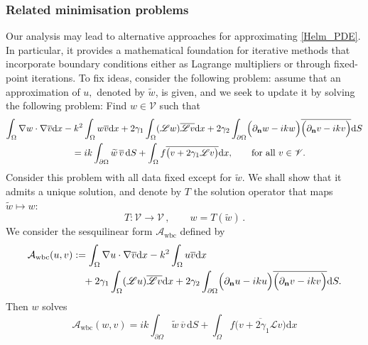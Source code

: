 \documentclass[twoside,11pt]{article}
\def\d{{\mathrm d}}
\def\L{{\mathscr{L}}}
\def\vbar{\overline{v}}
\def\Vc{{\mathscr V}}
\def\L{{\mathscr{L}}}
\begin{document}
{\subsubsection*{Related minimisation problems}
Our analysis may lead to alternative approaches for approximating \eqref{Helm_PDE}. In particular, it provides a mathematical foundation for iterative methods that incorporate boundary conditions either as Lagrange multipliers or through fixed-point iterations. To fix ideas, consider the following problem: assume that an approximation of $u, $ denoted by $\tilde w$, is given, and we seek to update it by solving the following problem:
  Find $w \in \Vc$ such that 
\begin{equation}\label{fixed_p_1}
\begin{split}
  \int_\Omega \nabla w\cdot \nabla \overline{v}  \d x  &-  k^2 \int_\Omega w \overline{v}  \d x
  +
  2\gamma_1 \int_{\Omega} (\L w)  \overline{\L v}  \d x
 +  2\gamma_2 \int_{\partial\Omega} 
\Bigl(\partial_{\mathbf n}w - i k w \Bigr) 
\overline{\Bigl(\partial_{\mathbf n}v - i k v \Bigr)}  \d S \\
&\quad  =   {ik} \int_{\partial \Omega}\widetilde w \, \vbar \,   \d S  +  \int_{\Omega} f  \overline{\bigl(v + 2\gamma_1 \L v\bigr)}  \d x ,
\qquad \text{for all } v \in \Vc .
\end{split}
\end{equation}
Consider this problem with all data fixed except for  
$\widetilde w.$ We shall show that it admits a unique solution, and denote by $T$ the solution operator that maps   $\widetilde w \mapsto w :$   
$$ T : \Vc \to \Vc \, , \qquad w = T ( \widetilde w )\, .$$
We 
consider the sesquilinear form $ \mathcal{A}_{\text{wbc}} $ defined by 
\begin{equation}
\begin{split}
\mathcal{A}_{\text{wbc}}(u,v)
&:= \int_\Omega \nabla u\cdot \nabla \overline{v}  \d x  -  k^2 \int_\Omega u \overline{v}  \d x \\
&\quad +  2\gamma_1 \int_{\Omega} (\L u)  \overline{\L v}  \d x
 +  2\gamma_2 \int_{\partial\Omega} 
\Bigl(\partial_{\mathbf n}u - i k u \Bigr) 
\overline{\Bigl(\partial_{\mathbf n}v - i k v \Bigr)}  \d S .
\end{split}
\end{equation}
Then $w$ solves
\begin{equation}\label{fixed_p_2}
\mathcal{A}_{\text{wbc}} (w,v)  = {ik} \int_{\partial \Omega}\widetilde w \, \vbar \,   \d S   + \int_{\Omega} f  \overline{\bigl(v + 2\gamma_1 \L v\bigr)}  \d x    

\end{equation}}
\end{document}
